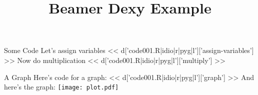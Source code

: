 \documentclass{beamer}
\title{Beamer Dexy Example}
\begin{document}
\begin{frame}
  \titlepage
\end{frame}

\begin{frame}[fragile]{Some Code}
Let's assign variables
<< d['code001.R|idio|r|pyg|l']['assign-variables'] >>
Now do multiplication
<< d['code001.R|idio|r|pyg|l']['multiply'] >>
\end{frame}

\begin{frame}[fragile]{A Graph}
Here's code for a graph:
<< d['code001.R|idio|r|pyg|l']['graph'] >>
And here's the graph:
\texttt{[image: plot.pdf]}
\end{frame}
\end{document}
